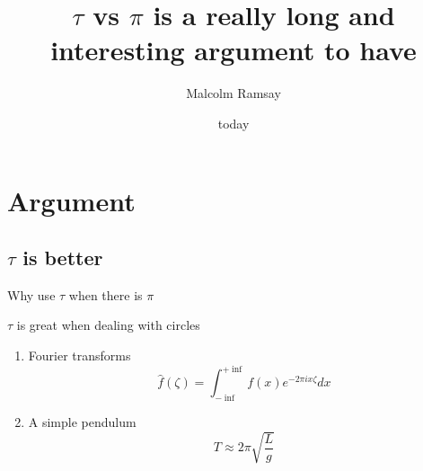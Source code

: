 \documentclass[aspectratio=169, 22pt]{beamer}
\title{$\tau$ vs $\pi$ is a really long and interesting argument to have}
\date{today}
\author[Malcolm]{Malcolm Ramsay}
\begin{document}
\begin{frame}
    \titlepage{}
\end{frame}

\section{Argument}
\subsection{$\tau$ is better}

\begin{frame}{Why use $\tau$ when there is $\pi$}
    \begin{theorem}
        $\tau$ is great when dealing with circles
    \end{theorem}

    \begin{enumerate}
            \item<1-> Fourier transforms
                \begin{equation}
                    \hat f(\zeta) = \int_{-\inf}^{+\inf} f(x) e^{-2\pi ix\zeta} dx
                \end{equation}
            \item<2-> A simple pendulum
                \begin{equation}
                    T \approx 2\pi \sqrt{\frac{L}{g}}
                \end{equation}
    \end{enumerate}
\end{frame}
\end{document}
